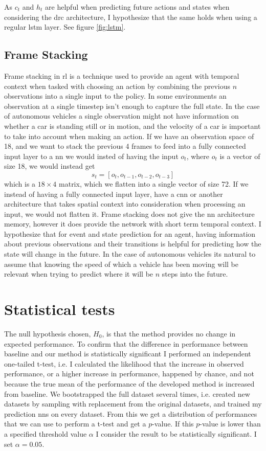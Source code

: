 \documentclass[UKenglish]{uiomasterthesis}
\begin{document}
As $c_t$ and $h_t$ are helpful when predicting future actions and states \cite{chung2024predictingfutureactionsreinforcement} when considering the \ac{drc} architecture, I hypothesize that the same holds when using a regular \ac{lstm} layer. See figure \ref{fig:lstm}.

\subsection{Frame Stacking}
Frame stacking in \ac{rl} is a technique used to provide an agent with temporal context when tasked with choosing an action by combining the previous $n$ observations into a single input to the policy. In some environments an observation at a single timestep isn't enough to capture the full state. In the case of autonomous vehicles a single observation might not have information on whether a car is standing still or in motion, and the velocity of a car is important to take into account when making an action.
If we have an observation space of 18, and we want to stack the previous 4 frames to feed into a fully connected input layer to a \ac{nn} we would insted of having the input $o_t$, where $o_t$ is a vector of size 18, we would instead get $$s_t = [o_t, o_{t-1}, o_{t-2}, o_{t-3}]$$ which is a $18\times4$ matrix, which we flatten into a single vector of size 72. If we instead of having a fully connected input layer, have a \ac{cnn} or another architecture that takes spatial context into consideration when processing an input, we would not flatten it.
Frame stacking does not give the \ac{nn} architecture memory, however it does provide the network with short term temporal context. I hypothesize that for event and state prediction for an agent, having information about previous observations and their transitions is helpful for predicting how the state will change in the future. In the case of autonomous vehicles its natural to assume that knowing the speed of which a vehicle has been moving will be relevant when trying to predict where it will be $n$ steps into the future.

\section{Statistical tests}
\label{sec:stat_meth}
The null hypothesis chosen, $H_0$, is that the method provides no change in expected performance. To confirm that the difference in performance between baseline and our method is statistically significant I performed an independent one-tailed t-test, i.e. I calculated the likelihood that the increase in observed performance, or a higher increase in performance, happened by chance, and not because the true mean of the performance of the developed method is increased from baseline.
We bootstrapped the full dataset several times, i.e. created new datasets by sampling with replacement from the original datasets, and trained my prediction \acp{nn} 
on every dataset. From this we get a distribution of performances that we can use to perform a t-test and get a $p$-value. If this $p$-value is lower than a specified threshold value $\alpha$ I consider the result to be statistically significant. I set $\alpha = 0.05$.
\end{document}
